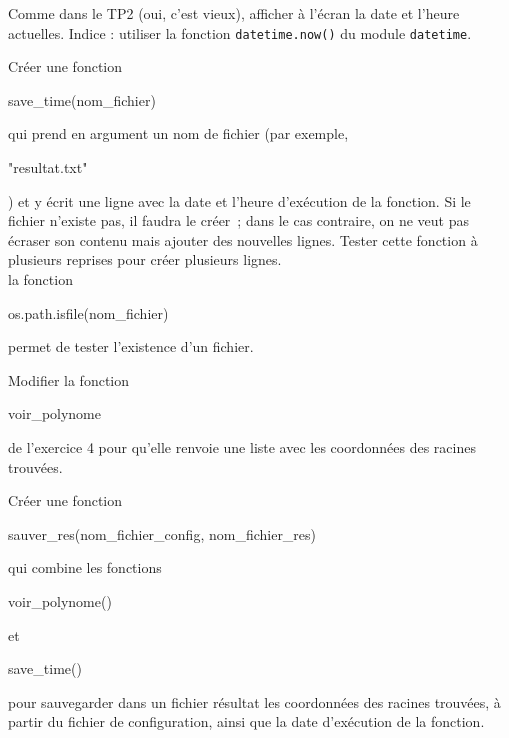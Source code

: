 \begin{correction}

\end{correction}

\pagebreak
\begin{enonce}
	[Stockage de résultat]

	\quessques Comme dans le TP2 (oui, c'est vieux), afficher à l'écran la date et l'heure actuelles.
	Indice : utiliser la fonction \texttt{datetime.now()} du module \texttt{datetime}.

	\ssques Créer une fonction \begin{texttt}save\_time(nom\_fichier)\end{texttt} qui prend en argument un nom de fichier (par exemple, \begin{texttt}"resultat.txt"\end{texttt}) et y écrit une ligne avec la date et l'heure d'exécution de la fonction.
	Si le fichier n'existe pas, il faudra le créer ; dans le cas contraire, on ne veut pas écraser son contenu mais ajouter des nouvelles lignes.
	Tester cette fonction à plusieurs reprises pour créer plusieurs lignes.\\

	\indic la fonction \begin{texttt}os.path.isfile(nom\_fichier)\end{texttt} permet de tester l'existence d'un fichier.

	\quessques Modifier la fonction \begin{texttt}voir\_polynome\end{texttt} de l'exercice 4 pour qu'elle renvoie une liste avec les coordonnées des racines trouvées.

	\ssques Créer une fonction \begin{texttt}sauver\_res(nom\_fichier\_config, nom\_fichier\_res)\end{texttt} qui combine les fonctions \begin{texttt}voir\_polynome()\end{texttt} et \begin{texttt}save\_time()\end{texttt} pour sauvegarder dans un fichier résultat les coordonnées des racines trouvées, à partir du fichier de configuration, ainsi que la date d'exécution de la fonction.



\end{enonce}

\begin{correction}

\end{correction}
